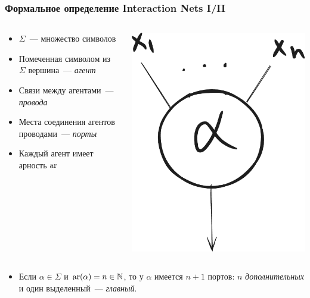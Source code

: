 \documentclass
  [ russian
  , aspectratio=169 %
  ] {beamer}
\begin{document}
\begin{frame}
    \frametitle{Формальное определение Interaction Nets I/II}

    \begin{columns}[totalwidth=\textwidth]
        \begin{column}{0.6\linewidth}
            \begin{itemize}
                \item $\Sigma$~--- множество символов
                \item Помеченная символом из $\Sigma$ вершина~--- \textit{агент}
                \item Связи между агентами~--- \textit{провода}
                \item Места соединения агентов проводами~--- \textit{порты}
                \item Каждый агент имеет арность $\operatorname{ar}$
            \end{itemize}
        \end{column}
        \begin{column}{0.4\linewidth}
            \begin{center}
                \includegraphics[width=0.3\linewidth]{figures/in_agent.pdf}
            \end{center}
        \end{column}
    \end{columns}
    \begin{itemize}
        \item Если $\alpha \in \Sigma$ и $\operatorname{ar}(\alpha) = n \in \mathbb{N}$, то у $\alpha$ имеется $n+1$ портов: $n$ \textit{дополнительных} и один выделенный~--- \textit{главный}.
    \end{itemize}

\end{frame}
\end{document}
